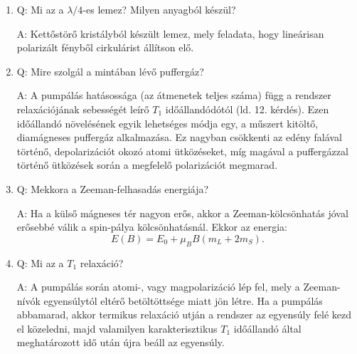 \begin{enumerate}
    \item Q: Mi az a $\lambda/4$-es lemez? Milyen anyagból készül? 
    \begin{displayquote}
    	A: Kettőstörő kristályból készült lemez, mely feladata, hogy lineárisan polarizált fényből cirkulárist állítson elő.
    \end{displayquote}
    
    \item Q: Mire szolgál a mintában lévő puffergáz?
    \begin{displayquote}
    	A: A pumpálás hatásossága (az átmenetek teljes száma) függ a rendszer relaxációjának sebességét leírő $T_{1}$ időállandódótól (ld. 12. kérdés). Ezen időállandó növelésének egyik lehetséges módja egy, a műszert kitöltő, diamágneses puffergáz alkalmazása. Ez nagyban csökkenti az edény falával történő, depolarizációt okozó atomi ütközéseket, míg magával a puffergázzal történő ütközések során a megfelelő polarizációt megmarad.
    \end{displayquote}
    
    \item Q: Mekkora a Zeeman-felhasadás energiája?
    \begin{displayquote}
    	A: Ha a külső mágneses tér nagyon erős, akkor a Zeeman-kölcsönhatás jóval erősebbé válik a spin-pálya kölcsönhatásnál. Ekkor az energia:
    		\begin{equation}
    		E \left( B \right)
    		=
    		E_{0} + \mu_{B} B \left(m_{L} + 2m_{S} \right).
    		\end{equation}
    \end{displayquote}
    
    \item Q: Mi az a $T_{1}$ relaxáció?
    \begin{displayquote}
    	A: A pumpálás során atomi-, vagy magpolarizáció lép fel, mely a Zeeman-nívók egyensúlytól eltérő betöltöttsége miatt jön létre. Ha a pumpálás abbamarad, akkor termikus relaxáció utján a rendszer az egyensúly felé kezd el közeledni, majd valamilyen karakterisztikus $T_{1}$ időállandó által meghatározott idő után újra beáll az egyensúly.
    \end{displayquote}
\end{enumerate}